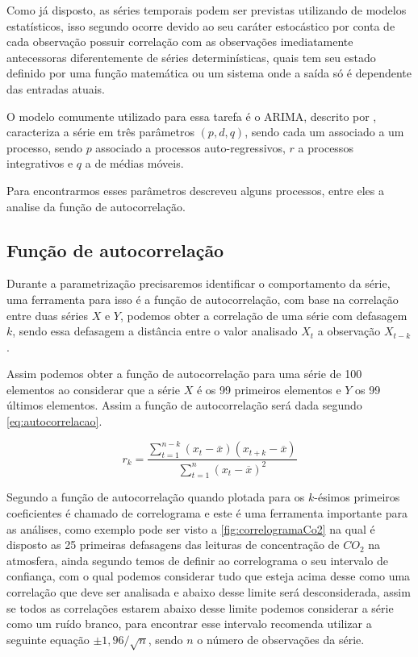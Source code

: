 \documentclass[
    12pt,
    oneside,
    a4paper,
    english,
    brazil
]{abntex2}
\begin{document}
Como já disposto, as séries temporais podem ser previstas utilizando de modelos
estatísticos, isso segundo  ocorre devido ao seu caráter
estocástico por conta de cada observação possuir correlação com as observações
imediatamente antecessoras diferentemente de séries determinísticas, quais tem
seu estado definido por uma função matemática ou um sistema onde a saída só é
dependente das entradas atuais.

O modelo comumente utilizado para essa tarefa é o ARIMA, descrito por
, caracteriza a série em três parâmetros $(p,d,q)$, sendo cada
um associado a um processo, sendo $p$ associado a processos auto-regressivos,
$r$ a processos integrativos e $q$ a de médias móveis.

Para encontrarmos esses parâmetros  descreveu alguns processos,
entre eles a analise da função de autocorrelação.

\subsection{Função de autocorrelação}\label{sec:corre}

Durante a parametrização precisaremos identificar o comportamento da série, uma
ferramenta para isso é a função de autocorrelação, com base na correlação entre
duas séries $X$ e $Y$, podemos obter a correlação de uma série com defasagem
$k$, sendo essa defasagem a distância entre o valor analisado $X_t$ a
observação $X_{t-k}$.

Assim podemos obter a função de autocorrelação para uma série de 100 elementos
ao considerar que a série $X$ é os 99 primeiros elementos e $Y$ os 99 últimos
elementos. Assim a função de autocorrelação será dada segundo
\autoref{eq:autocorrelacao}.

\begin{equation}
    \label{eq:autocorrelacao}
    r_k = \frac{\sum_{t=1}^{n-k}{(x_t - \overline{x})(x_{t+k} -
    \overline{x})}}{\sum_{t=1}^{n}{(x_t - \overline{x})^2}}
\end{equation}

Segundo  a função de autocorrelação quando plotada para os
$k$-ésimos primeiros coeficientes é chamado de correlograma e este é uma
ferramenta importante para as análises, como exemplo pode ser visto a
\autoref{fig:correlogramaCo2} na qual é disposto as 25 primeiras defasagens das
leituras de concentração de $CO_2$ na atmosfera, ainda segundo
 temos de definir ao correlograma o seu intervalo de
confiança, com o qual podemos considerar tudo que esteja acima desse como uma
correlação que deve ser analisada e abaixo desse limite será desconsiderada,
assim se todos as correlações estarem abaixo desse limite podemos considerar a
série como um ruído branco, para encontrar esse intervalo 
recomenda utilizar a seguinte equação $\pm{}1,96/\sqrt{n}$, sendo $n$ o número
de observações da série.
\end{document}
